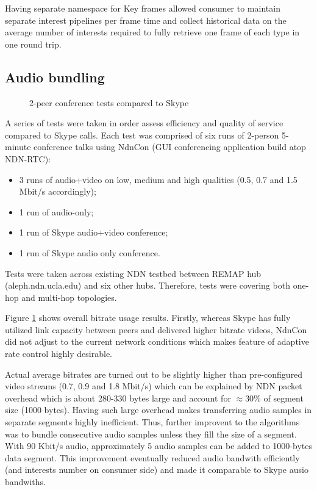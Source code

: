\documentclass{icn/sig-alternate-2012} %
\newcommand{\ndnrtcName}{NDN-RTC} %
\begin{document}
Having separate namespace for Key frames allowed consumer to maintain separate interest pipelines per frame time and collect historical data on the average number of interests required to fully retrieve one frame of each type in one round trip.

\subsection{Audio bundling}
\begin{figure}[t!]
\centering
\begin{tiny}
\def\svgwidth{0.5\textwidth}
\end{tiny}
\vspace{-18pt}
\caption{2-peer conference tests compared to Skype}
\label{fig:tests-skype}
\end{figure}

A series of tests were taken in order assess efficiency and quality of service compared to Skype calls. Each test was comprised of six runs of 2-person 5-minute conference talks using NdnCon (GUI conferencing application build atop \ndnrtcName{}):
\begin{itemize}
\item 3 runs of audio+video on low, medium and high qualities (0.5, 0.7 and 1.5 Mbit/s accordingly);
\item 1 run of audio-only;
\item 1 run of Skype audio+video conference;
\item 1 run of Skype audio only conference.
\end{itemize}

Tests were taken across existing NDN testbed between REMAP hub (aleph.ndn.ucla.edu) and six other hubs. Therefore, tests were covering both one-hop and multi-hop topologies.

Figure \ref{fig:tests-skype} shows overall bitrate usage results. Firstly, whereas Skype has fully utilized link capacity between peers and delivered higher bitrate videos, NdnCon did not adjust to the current network conditions which makes feature of adaptive rate control highly desirable.

Actual average bitrates are turned out to be slightly higher than pre-configured video streams (0.7, 0.9 and 1.8 Mbit/s) which can be explained by NDN packet overhead which is about 280-330 bytes large and account for $\approx$30\% of segment size (1000 bytes). Having such large overhead makes transferring audio samples in separate segments highly inefficient. Thus, further improvent to the algorithms was to bundle consecutive audio samples unless they fill the size of a segment. With 90 Kbit/s audio, approximately 5 audio samples can be added to 1000-bytes data segment. This improvement eventually reduced audio bandwith efficiently (and interests number on consumer side) and made it comparable to Skype ausio bandwiths.
\end{document}

